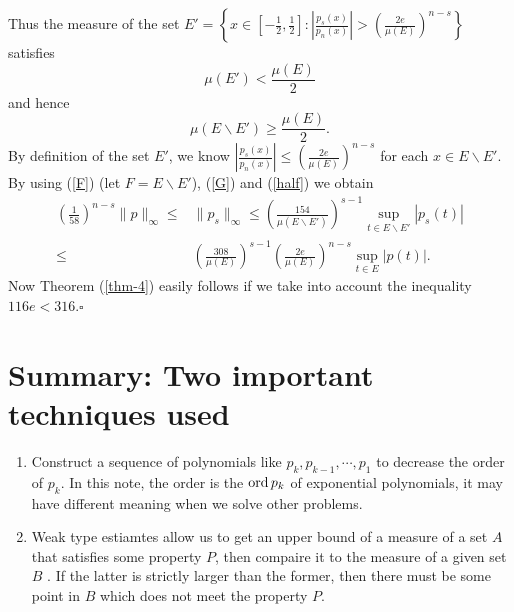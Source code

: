      Thus the measure of the set $E' = \left\{ x \in \left[ -\frac{1}{2},\frac{1}{2} \right] :\left| \frac{p_s(x)}{p_n(x)}\right|> \left( \frac{2e}{\mu(E)} \right)^{n-s}  \right\} $ satisfies
     \[
       \mu(E')< \frac{\mu(E)}{2}
     \] 
     and hence
     \begin{equation}
       \mu(E\backslash E')\ge  \frac{\mu(E)}{2}.\label{half}
     \end{equation}
     By definition of the set $E'$, we know $\left| \frac{p_s(x)}{p_n(x)} \right| \le \left( \frac{2e}{\mu(E)} \right) ^{n-s}$ for each $x\in E\backslash E'$.
     By using (\ref{F}) (let $F=E\backslash E'$), (\ref{G}) and (\ref{half}) we obtain
     \begin{equation*}
       \begin{aligned}
	 \left( \frac{1}{58} \right) ^{n-s}\|p\|_{\infty}\le & \|p_s\|_{\infty}\le \left( \frac{154}{\mu\left( E\backslash E' \right) } \right)^{s-1} \sup_{t\in E\backslash E'}\left| p_s(t) \right|\\
	 \le  & \left( \frac{308}{\mu(E)} \right) ^{s-1}\left( \frac{2e}{\mu(E)} \right) ^{n-s}\sup_{t\in E}\left| p(t) \right| .
       \end{aligned}
     \end{equation*}
     Now Theorem (\ref{thm-4}) easily follows if we take into account the inequality $116e<316$.\hfill $\square$\par

 \section{Summary: Two important techniques used}
 \begin{enumerate}
   \item Construct a sequence of polynomials like $p_k,p_{k-1},\cdots,p_1$ to decrease the order of $p_k$. In this note, the order is the  $\operatorname{ord} p_k$ of exponential polynomials, it may have different meaning when we solve other problems. 
   \item Weak type estiamtes allow us to get an upper bound of a measure of a set $A$ that satisfies some property $P$, then compaire it  to the measure of a given set $B$ . If the latter is strictly larger than  the former, then there must be some point in  $B$ which does not  meet the property $P$.
 \end{enumerate}

